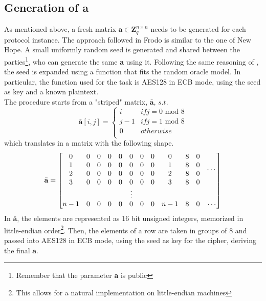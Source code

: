 \subsection{Generation of \textbf{a}}
As mentioned above, a fresh matrix $\textbf{a} \in \mathbf{Z}^{n\times n}_q$ needs to be generated for each protocol instance. The approach followed in Frodo is similar to the one of New Hope. A small uniformly random seed is generated and shared between the parties\footnote{Remember that the parameter \textbf{a} is public}, who can generate the same \textbf{a} using it. Following the same reasoning of \cite{newhope}, the seed is expanded using a function that fits the random oracle model. In particular, the function used for the task is AES128 in ECB mode, using the seed as key and a known plaintext.\\
The procedure starts from a "striped" matrix, $\bar{\textbf{a}}$, $s.t.$ 
\begin{equation*}
\bar{\textbf{a}}[i,j]=
\begin{cases}
i   & if j=0\text{ mod }8    \\
j-1 & if j=1\text{ mod }8    \\
0   & otherwise              \\
\end{cases}
\end{equation*}
which translates in a matrix with the following shape.
\begin{equation*}
\bar{\textbf{a}}=
\setcounter{MaxMatrixCols}{12}
\begin{bmatrix}
0  & 0 & 0 & 0 & 0 & 0 & 0 & 0 & 0 & 8 & 0 & \multirow{4}{*}{$\cdots$}     \\
1  & 0 & 0 & 0 & 0 & 0 & 0 & 0 & 1 & 8 & 0 & \\
2  & 0 & 0 & 0 & 0 & 0 & 0 & 0 & 2 & 8 & 0 & \\
3  & 0 & 0 & 0 & 0 & 0 & 0 & 0 & 3 & 8 & 0 & \\
\multicolumn{11}{c}{$\vdots$}              & \\
n-1& 0 & 0 & 0 & 0 & 0 & 0 & 0 &n-1& 8 & 0 & \cdots \\
\end{bmatrix}
\end{equation*}
In $\bar{\textbf{a}}$, the elements are represented as 16 bit unsigned integers, memorized in little-endian order\footnote{This allows for a natural implementation on little-endian machines}. Then, the elements of a row are taken in groups of 8 and passed into AES128 in ECB mode, using the seed as key for the cipher, deriving the final $\textbf{a}$.
